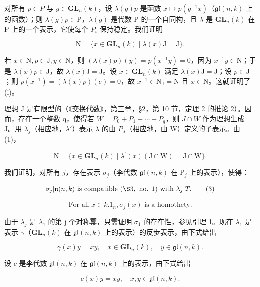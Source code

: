 对所有 \(p \in P\) 与 \(g \in \mathbf{GL}_{n}(k)\)，设 \(\lambda(g)p\) 是函数 \(x \mapsto p(g^{-1}x)\)（\(\mathfrak{gl}(n,k)\) 上的函数）；则 \(\lambda(g)p \in \mathrm{P}\)，\(\lambda(g)\) 是代数 P 的一个自同构，且 \(\lambda\) 是 \(\mathbf{GL}_{n}(k)\) 在 P 上的一个表示，它使每个 \(P_{i}\) 保持稳定。我们证明

\[
\mathrm{N} = \{x \in \mathbf {G L} _ {n} (k) \mid \lambda (x) \mathrm{J} = \mathrm{J} \}.\tag{1}
\]

若 \(x \in \mathrm{N}, p \in \mathrm{J}, y \in \mathrm{N}\)，则 \((\lambda(x)p)(y) = p(x^{-1}y) = 0\)，因为 \(x^{-1}y \in \mathrm{N}\)；于是 \(\lambda(x)p \in \mathrm{J}\)，故 \(\lambda(x)\mathrm{J} = \mathrm{J}\)。设 \(x \in \mathbf{GL}_n(k)\) 满足 \(\lambda(x)\mathrm{J} = \mathrm{J}\)；设 \(p \in \mathrm{J}\)；则 \(p(x^{-1}) = (\lambda(x)p)(e) = 0\)，故 \(x^{-1} \in \mathrm{N}_{\mathrm{J}} = \mathrm{N}\) 且 \(x \in \mathrm{N}\)。这就证明了 (i)。

理想 J 是有限型的（《交换代数》，第三章，§2，第 10 节，定理 2 的推论 2）。因而，存在一个整数 q，使得若 \(W = P_{0} + P_{1} + \cdots + P_{q}\)，则 \(J \cap W\) 作为理想生成 J。用 \(\lambda_{j}\)（相应地，\(\lambda'\)）表示 \(\lambda\) 的由 \(P_{J}\)（相应地，由 W）定义的子表示。由 (1)，

\[
\mathrm{N} = \{x \in \mathbf {G L} _ {n} (k) \mid \lambda^ {\prime} (x) (\mathrm{J} \cap \mathrm{W}) = \mathrm{J} \cap \mathrm{W} \}.\tag{2}
\]

我们证明，对所有 \(j\)，存在表示 \(\sigma_{j}\)（李代数 \(\mathfrak{gl}(n,k)\) 在 \(\mathrm{P}_j\) 上的表示），使得：

\[
\sigma_ {j} | \mathfrak {n} (n, k) \text {   is   compatible   } (\S 3, \text {   no.   } 1) \text {   with   } \lambda_ {j} | T.\tag{3}
\]

\[
\text { For   all } x \in k. 1 _ {n}, \sigma_ {j} (x) \text { is   a   homothety. }\tag{4}
\]

由于 \(\lambda_{j}\) 是 \(\lambda_{1}\) 的第 j 个对称幂，只需证明 \(\sigma_{1}\) 的存在性，参见引理 1。现在 \(\lambda_{1}\) 是表示 \(\gamma\)（\(\mathbf{GL}_{n}(k)\) 在 \(\mathfrak{gl}(n,k)\) 上的表示）的反步表示，由下式给出

\[
\gamma (x) y = x y, \quad x \in \mathbf {G L} _ {n} (k), \quad y \in \mathfrak {g l} (n, k).
\]

设 \(c\) 是李代数 \(\mathfrak{gl}(n,k)\) 在 \(\mathfrak{gl}(n,k)\) 上的表示，由下式给出

\[
c (x) y = x y, \quad x, y \in \mathfrak {g l} (n, k).
\]

